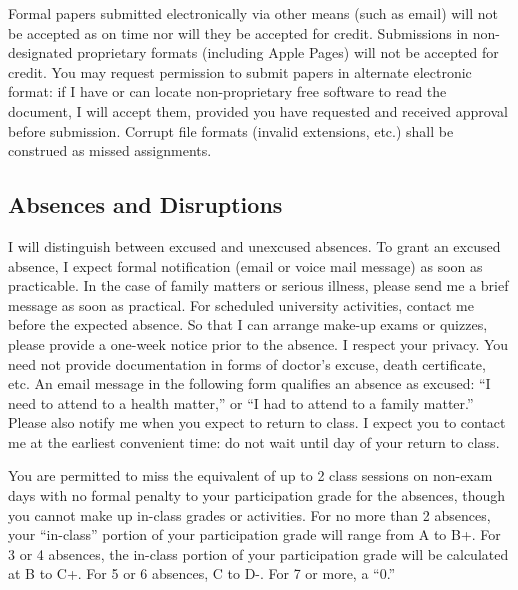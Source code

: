 \documentclass[]{article}
\begin{document}
Formal papers submitted electronically via other means (such as email)
will not be accepted as on time nor will they be accepted for credit.
Submissions in non-designated proprietary formats (including Apple
Pages) will not be accepted for credit. You may request permission to
submit papers in alternate electronic format: if I have or can locate
non-proprietary free software to read the document, I will accept them,
provided you have requested and received approval before submission.
Corrupt file formats (invalid extensions, etc.) shall be construed as
missed assignments.

\subsection{Absences and Disruptions}\label{absences-and-disruptions}

I will distinguish between excused and unexcused absences. To grant an
excused absence, I expect formal notification (email or voice mail
message) as soon as practicable. In the case of family matters or
serious illness, please send me a brief message as soon as practical.
For scheduled university activities, contact me {before} the expected
absence. So that I can arrange make-up exams or quizzes, please provide
a one-week notice prior to the absence. I respect your privacy. You need
not provide documentation in forms of doctor's excuse, death
certificate, etc. An email message in the following form qualifies an
absence as excused: ``I need to attend to a health matter,'' or ``I had
to attend to a family matter.'' Please also notify me when you expect to
return to class. I expect you to contact me at the earliest convenient
time: do not wait until day of your return to class.

You are permitted to miss the equivalent of up to 2 class sessions on
non-exam days with no formal penalty to your participation grade for the
absences, though you cannot make up in-class grades or activities. For
no more than 2 absences, your ``in-class'' portion of your participation
grade will range from A to B+. For 3 or 4 absences, the in-class portion
of your participation grade will be calculated at B to C+. For 5 or 6
absences, C to D-. For 7 or more, a ``0.''
\end{document}
